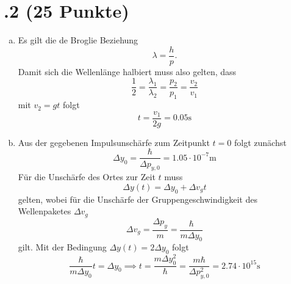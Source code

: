 \section*{\nr.2 \tittwo (25 Punkte)}
\begin{enumerate}[(a)]
\item Es gilt die de Broglie Beziehung
\begin{equation}
  \lambda=\frac{h}{p}.
\end{equation}
Damit sich die Wellenlänge halbiert muss also gelten, dass
\begin{equation}
  \frac{1}{2}=\frac{\lambda_1}{\lambda_2}=\frac{p_2}{p_1}=\frac{v_2}{v_1}
\end{equation}
mit $v_2=gt$ folgt
\begin{equation}
  t=\frac{v_1}{2g}=0.05\mathrm{s}
\end{equation}
\item Aus der gegebenen Impulsunschärfe zum Zeitpunkt $t=0$ folgt zunächst 
\begin{equation}
  \Delta y_0=\frac{\hbar}{\Delta p_{y,0}}=1.05\cdot 10^{-7}\mathrm{m}
\end{equation}
Für die Unschärfe des Ortes zur Zeit $t$ muss
\begin{equation}
  \Delta y(t)=\Delta y_0+\Delta v_g t
\end{equation}
gelten, wobei für die Unschärfe der Gruppengeschwindigkeit des Wellenpaketes $\Delta v_g$ 
\begin{equation}
  \Delta v_g = \frac{\Delta p_y}{m}= \frac{\hbar}{m\Delta y_0}
\end{equation}
gilt.
Mit der Bedingung $\Delta y(t)=2\Delta y_0$ folgt
\begin{equation}
\frac{\hbar}{m\Delta y_0}t=\Delta y_0\implies t=\frac{m\Delta y_0^2}{\hbar}=\frac{m\hbar}{\Delta p_{y,0}^2}=2.74\cdot10^{15}\mathrm{s}
\end{equation}
\end{enumerate}